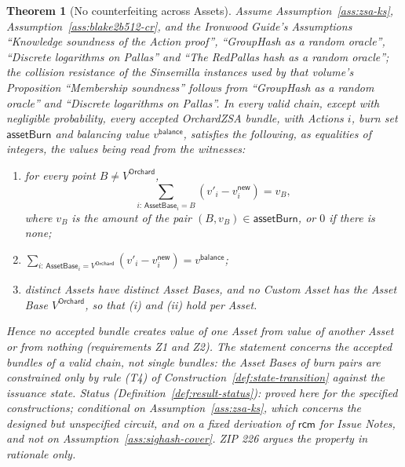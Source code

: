 \documentclass[11pt,a4paper]{article}
\newtheorem{theorem}{Theorem}[section]
\theoremstyle{definition}
\newcommand{\rcm}{\ensuremath{\mathsf{rcm}}}
\begin{document}
\begin{theorem}[No counterfeiting across Assets]\label{thm:no-counterfeit}
Assume Assumption~\ref{ass:zsa-ks}, Assumption~\ref{ass:blake2b512-cr}, and
the \emph{Ironwood Guide}'s Assumptions ``Knowledge soundness of the Action
proof'', ``GroupHash as a random oracle'', ``Discrete logarithms on
Pallas'' and ``The RedPallas hash as a random oracle''; the collision
resistance of the Sinsemilla instances used by that volume's Proposition
``Membership soundness'' follows from ``GroupHash as a random oracle'' and
``Discrete logarithms on Pallas''. In every valid
chain, except with negligible probability, every accepted OrchardZSA bundle,
with Actions $i$, burn set $\mathsf{assetBurn}$ and balancing value
$v^{\mathsf{balance}}$, satisfies the following, as equalities of integers,
the values being read from the witnesses:
\begin{enumerate}
\item[(i)] for every point $B \neq V^{\mathsf{Orchard}}$,
  \[
    \sum_{i :\, \mathsf{AssetBase}_i = B} (v'_i - v^{\mathsf{new}}_i) = v_B,
  \]
  where $v_B$ is the amount of the pair $(B, v_B) \in \mathsf{assetBurn}$,
  or $0$ if there is none;
\item[(ii)] $\sum_{i :\, \mathsf{AssetBase}_i = V^{\mathsf{Orchard}}}
  (v'_i - v^{\mathsf{new}}_i) = v^{\mathsf{balance}}$;
\item[(iii)] distinct Assets have distinct Asset Bases, and no Custom Asset
  has the Asset Base $V^{\mathsf{Orchard}}$, so that (i) and (ii) hold per
  Asset.
\end{enumerate}
Hence no accepted bundle creates value of one Asset from value of another
Asset or from nothing (requirements Z1 and Z2). The statement concerns the
accepted bundles of a valid chain, not single bundles: the Asset Bases of
burn pairs are constrained only by rule (T4) of
Construction~\ref{def:state-transition} against the issuance state. Status
(Definition~\ref{def:result-status}): proved here for the specified
constructions; conditional on Assumption~\ref{ass:zsa-ks}, which concerns
the designed but unspecified circuit, and on a fixed derivation of $\rcm$
for Issue Notes, and not on Assumption~\ref{ass:sighash-cover}. ZIP 226
argues the property in rationale only.
\end{theorem}
\end{document}
